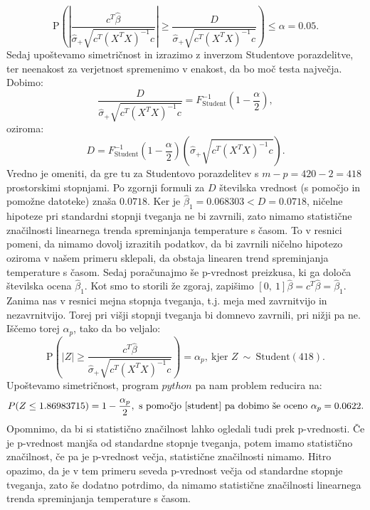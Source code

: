 \documentclass{article}
\begin{document}
$$
\text{P}\left(\left|\frac{c^T\hat{\beta}}{\hat{\sigma}_{+}\sqrt{c^T(X^TX)^{-1}c}}\right| \geq \frac{D}{\hat{\sigma}_{+}\sqrt{c^T(X^TX)^{-1}c}}\right)\leq \alpha = 0.05. 
$$
Sedaj upoštevamo simetričnost in izrazimo z inverzom Studentove porazdelitve, ter neenakost za verjetnost spremenimo v enakost, da bo moč testa največja. Dobimo:
$$
\frac{D}{\hat{\sigma}_{+}\sqrt{c^T(X^TX)^{-1}c}} = F^{-1}_{\text{Student}}\left(1 - \frac{\alpha}{2}\right),
$$
oziroma:
$$
D = F^{-1}_{\text{Student}}\left(1 - \frac{\alpha}{2}\right) \left(\hat{\sigma}_{+}\sqrt{c^T(X^TX)^{-1}c}\right).
$$
Vredno je omeniti, da gre tu za Studentovo porazdelitev s $m - p = 420 - 2 = 418$ prostorskimi stopnjami. 
Po zgornji formuli za $D$ številska vrednost (s pomočjo \cite{student} in pomožne datoteke) znaša $0.0718$.
\newline
Ker je $\hat{\beta}_1 = 0.068303 < D = 0.0718$, ničelne hipoteze pri standardni stopnji tveganja ne bi zavrnili, zato nimamo statistične značilnosti linearnega trenda spreminjanja temperature s časom. 
To v resnici pomeni, da nimamo dovolj izrazitih podatkov, da bi zavrnili ničelno hipotezo oziroma v našem primeru sklepali, da obstaja linearen trend spreminjanja temperature s časom.
\newline
\newline
Sedaj poračunajmo še p-vrednost preizkusa, ki ga določa številska ocena $\hat{\beta}_1$. 
Kot smo to storili že zgoraj, zapišimo $[0,~1]\hat{\beta} = c^T \hat{\beta} = \hat{\beta}_1$.
Zanima nas v resnici mejna stopnja tveganja, t.j. meja med zavrnitvijo in nezavrnitvijo. 
Torej pri višji stopnji tveganja bi domnevo zavrnili, pri nižji pa ne. 
Iščemo torej $\alpha_p$, tako da bo veljalo:
$$
\text{P}\left(|Z| \geq \frac{c^T\hat{\beta}}{\hat{\sigma}_{+}\sqrt{c^T(X^TX)^{-1}c}}\right) = \alpha_p,~\text{kjer }Z~\sim~\text{Student}(418). 
$$
Upoštevamo simetričnost, program $python$ pa nam problem reducira na: 
$$
P(Z \leq 1.86983715) = 1 - \frac{\alpha_p}{2},~\text{s pomočjo \cite{student} pa dobimo še oceno $\alpha_p = 0.0622$.}
$$
Opomnimo, da bi si statistično značilnost lahko ogledali tudi prek p-vrednosti. Če je p-vrednost manjša od standardne stopnje tveganja, potem imamo statistično značilnost, če pa je p-vrednost večja, statistične značilnosti nimamo. 
Hitro opazimo, da je v tem primeru seveda p-vrednost večja od standardne stopnje tveganja, zato še dodatno potrdimo, da nimamo statistične značilnosti linearnega trenda spreminjanja temperature s časom.
\newline
\newline
\end{document}

